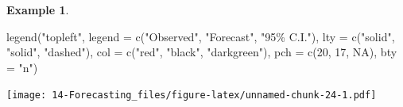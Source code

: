 \documentclass[
]{book}
\newenvironment{Shaded}{\begin{snugshade}}{\end{snugshade}}
\newcommand{\AttributeTok}[1]{\textcolor[rgb]{0.77,0.63,0.00}{#1}}
\newcommand{\ConstantTok}[1]{\textcolor[rgb]{0.00,0.00,0.00}{#1}}
\newcommand{\DecValTok}[1]{\textcolor[rgb]{0.00,0.00,0.81}{#1}}
\newcommand{\FunctionTok}[1]{\textcolor[rgb]{0.00,0.00,0.00}{#1}}
\newcommand{\NormalTok}[1]{#1}
\newcommand{\OtherTok}[1]{\textcolor[rgb]{0.56,0.35,0.01}{#1}}
\newcommand{\StringTok}[1]{\textcolor[rgb]{0.31,0.60,0.02}{#1}}
\theoremstyle{definition}
\theoremstyle{definition}
\newtheorem{example}{Example}[chapter]
\theoremstyle{definition}
\theoremstyle{definition}
\theoremstyle{remark}
\begin{document}
\begin{example}
\begin{Shaded}
\begin{Highlighting}[]
\FunctionTok{legend}\NormalTok{(}\StringTok{"topleft"}\NormalTok{, }\AttributeTok{legend =} \FunctionTok{c}\NormalTok{(}\StringTok{"Observed"}\NormalTok{, }\StringTok{"Forecast"}\NormalTok{, }
    \StringTok{"95\% C.I."}\NormalTok{), }\AttributeTok{lty =} \FunctionTok{c}\NormalTok{(}\StringTok{"solid"}\NormalTok{, }\StringTok{"solid"}\NormalTok{, }\StringTok{"dashed"}\NormalTok{), col }
    \OtherTok{=} \FunctionTok{c}\NormalTok{(}\StringTok{"red"}\NormalTok{, }\StringTok{"black"}\NormalTok{, }\StringTok{"darkgreen"}\NormalTok{), }\AttributeTok{pch =} \FunctionTok{c}\NormalTok{(}\DecValTok{20}\NormalTok{, }\DecValTok{17}\NormalTok{, }
    \ConstantTok{NA}\NormalTok{), }\AttributeTok{bty =} \StringTok{"n"}\NormalTok{)}
\end{Highlighting}
\end{Shaded}

\texttt{[image: 14-Forecasting\_files/figure-latex/unnamed-chunk-24-1.pdf]}
\end{example}
\end{document}
